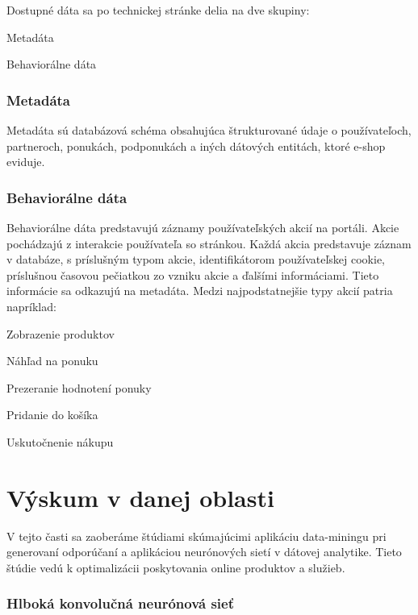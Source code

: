 Dostupné dáta sa po technickej stránke delia na dve skupiny: 
\begin{my_itemize}
	\item {Metadáta} 
	\item {Behaviorálne dáta}
\end{my_itemize}

\subsection{Metadáta}

Metadáta sú databázová schéma obsahujúca štrukturované údaje o používateľoch, partneroch, ponukách, podponukách a iných dátových entitách, ktoré e-shop eviduje. 

\subsection{Behaviorálne dáta}
Behaviorálne dáta predstavujú záznamy používateľských akcií na portáli. Akcie pochádzajú z interakcie používateľa so stránkou. Každá akcia predstavuje záznam v databáze, s príslušným typom akcie, identifikátorom používateľskej cookie, príslušnou časovou pečiatkou zo vzniku akcie a ďalšími informáciami. Tieto informácie sa odkazujú na metadáta. \newline Medzi najpodstatnejšie typy akcií patria napríklad: 
\begin{my_itemize}
	\item {Zobrazenie produktov} 
	\item {Náhľad na ponuku}
	\item {Prezeranie hodnotení ponuky}
	\item {Pridanie do košíka}
	\item {Uskutočnenie nákupu}
\end{my_itemize}


\chapter{Výskum v danej oblasti}
\label{analyza_vyskum_danej_oblasti}

V tejto časti sa zaoberáme štúdiami skúmajúcimi aplikáciu data-miningu pri generovaní odporúčaní a aplikáciou neurónových sietí v dátovej analytike. Tieto štúdie vedú k optimalizácii poskytovania online produktov a služieb.


\subsection{Hlboká konvolučná neurónová sieť}
\label{metoda_konvolucna}


